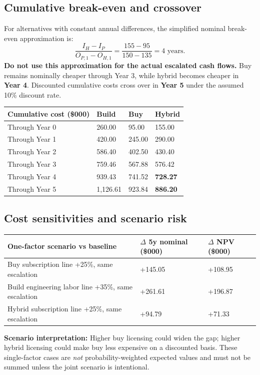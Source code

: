 \documentclass[10pt,letterpaper]{article}
\begin{document}
\subsection{Cumulative break-even and crossover}
For alternatives with constant annual differences, the simplified nominal break-even approximation is:
\[\frac{I_H-I_P}{O_{P,1}-O_{H,1}}=\frac{155-95}{150-135}=4\text{ years}.\]
\textbf{Do not use this approximation for the actual escalated cash flows.} Buy remains nominally cheaper through Year 3, while hybrid becomes cheaper in \textbf{Year 4}. Discounted cumulative costs cross over in \textbf{Year 5} under the assumed 10\% discount rate.

\begin{tabular}{@{}L{1.55in}R{1.25in}R{1.25in}R{1.25in}@{}}
\toprule
\textbf{Cumulative cost (\$000)} & \textbf{Build} & \textbf{Buy} & \textbf{Hybrid}\\\midrule
Through Year 0 & 260.00 & 95.00 & 155.00\\
Through Year 1 & 420.00 & 245.00 & 290.00\\
Through Year 2 & 586.40 & 402.50 & 430.40\\
Through Year 3 & 759.46 & 567.88 & 576.42\\
Through Year 4 & 939.43 & 741.52 & \textbf{728.27}\\
Through Year 5 & 1,126.61 & 923.84 & \textbf{886.20}\\
\bottomrule
\end{tabular}

\subsection{Cost sensitivities and scenario risk}

\begin{tabular}{@{}L{2.75in}R{1.25in}R{1.25in}@{}}
\toprule
\textbf{One-factor scenario vs baseline} & \textbf{$\Delta$ 5y nominal (\$000)} & \textbf{$\Delta$ NPV (\$000)}\\\midrule
Buy subscription line +25\%, same escalation & +145.05 & +108.95\\
Build engineering labor line +35\%, same escalation & +261.61 & +196.87\\
Hybrid subscription line +25\%, same escalation & +94.79 & +71.33\\
\bottomrule
\end{tabular}
\textbf{Scenario interpretation:} Higher buy licensing could widen the gap; higher hybrid licensing could make buy less expensive on a discounted basis. These single-factor cases are \emph{not} probability-weighted expected values and must not be summed unless the joint scenario is intentional.
\end{document}
